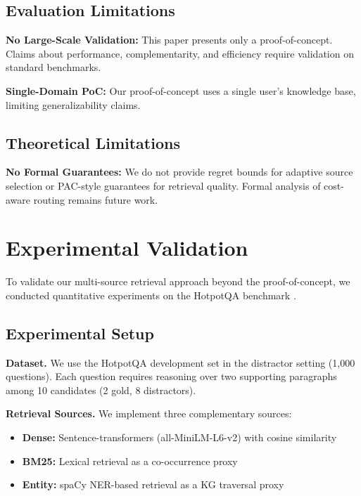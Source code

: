 \documentclass[11pt,a4paper]{article}
\begin{document}
\subsection{Evaluation Limitations}

\textbf{No Large-Scale Validation:} This paper presents only a proof-of-concept. Claims about performance, complementarity, and efficiency require validation on standard benchmarks.

\textbf{Single-Domain PoC:} Our proof-of-concept uses a single user's knowledge base, limiting generalizability claims.

\subsection{Theoretical Limitations}

\textbf{No Formal Guarantees:} We do not provide regret bounds for adaptive source selection or PAC-style guarantees for retrieval quality. Formal analysis of cost-aware routing remains future work.

\section{Experimental Validation}
\label{sec:experiments}

To validate our multi-source retrieval approach beyond the proof-of-concept, we conducted quantitative experiments on the HotpotQA benchmark \citep{yang2018hotpotqa}.

\subsection{Experimental Setup}

\textbf{Dataset.} We use the HotpotQA development set in the distractor setting (1,000 questions). Each question requires reasoning over two supporting paragraphs among 10 candidates (2 gold, 8 distractors).

\textbf{Retrieval Sources.} We implement three complementary sources:
\begin{itemize}
    \item \textbf{Dense:} Sentence-transformers (all-MiniLM-L6-v2) with cosine similarity
    \item \textbf{BM25:} Lexical retrieval as a co-occurrence proxy
    \item \textbf{Entity:} spaCy NER-based retrieval as a KG traversal proxy
\end{itemize}
\end{document}
